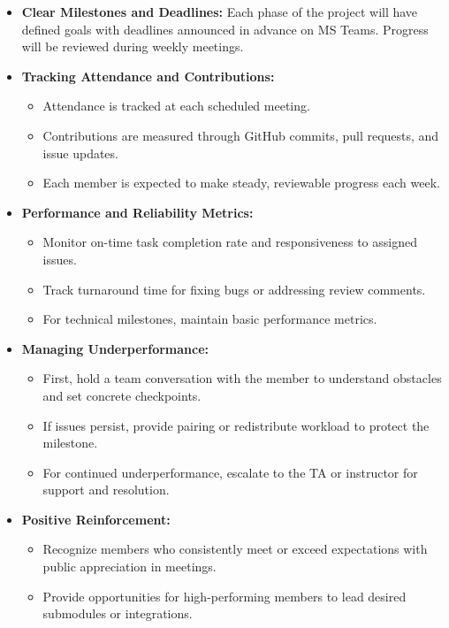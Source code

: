 \documentclass{article}
\begin{document}
\begin{itemize}
  \item \textbf{Clear Milestones and Deadlines:} Each phase of the project will have defined goals with deadlines announced in advance on MS Teams. Progress will be reviewed during weekly meetings.

  \item \textbf{Tracking Attendance and Contributions:}
    \begin{itemize}
      \item Attendance is tracked at each scheduled meeting.
      \item Contributions are measured through GitHub commits, pull requests, and issue updates.
      \item Each member is expected to make steady, reviewable progress each week.
    \end{itemize}
  
  \item \textbf{Performance and Reliability Metrics:}
    \begin{itemize}
      \item Monitor on-time task completion rate and responsiveness to assigned issues.
      \item Track turnaround time for fixing bugs or addressing review comments.
      \item For technical milestones, maintain basic performance metrics.
    \end{itemize}

  \item \textbf{Managing Underperformance:}
    \begin{itemize}
      \item First, hold a team conversation with the member to understand obstacles and set concrete checkpoints.
      \item If issues persist, provide pairing or redistribute workload to protect the milestone.
      \item For continued underperformance, escalate to the TA or instructor for support and resolution.
    \end{itemize}

  \item \textbf{Positive Reinforcement:}
    \begin{itemize}
      \item Recognize members who consistently meet or exceed expectations with public appreciation in meetings.
      \item Provide opportunities for high-performing members to lead desired submodules or integrations.
    \end{itemize}
\end{itemize}
\end{document}
